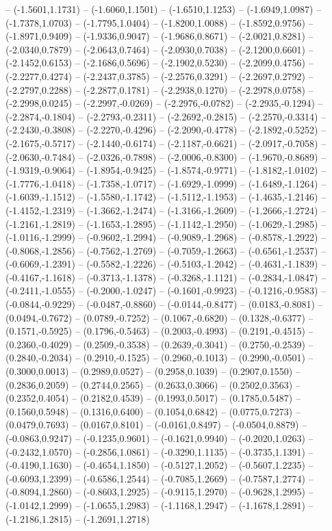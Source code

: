 {	-- (-1.5601,1.1731)
	-- (-1.6060,1.1501)
	-- (-1.6510,1.1253)
	-- (-1.6949,1.0987)
	-- (-1.7378,1.0703)
	-- (-1.7795,1.0404)
	-- (-1.8200,1.0088)
	-- (-1.8592,0.9756)
	-- (-1.8971,0.9409)
	-- (-1.9336,0.9047)
	-- (-1.9686,0.8671)
	-- (-2.0021,0.8281)
	-- (-2.0340,0.7879)
	-- (-2.0643,0.7464)
	-- (-2.0930,0.7038)
	-- (-2.1200,0.6601)
	-- (-2.1452,0.6153)
	-- (-2.1686,0.5696)
	-- (-2.1902,0.5230)
	-- (-2.2099,0.4756)
	-- (-2.2277,0.4274)
	-- (-2.2437,0.3785)
	-- (-2.2576,0.3291)
	-- (-2.2697,0.2792)
	-- (-2.2797,0.2288)
	-- (-2.2877,0.1781)
	-- (-2.2938,0.1270)
	-- (-2.2978,0.0758)
	-- (-2.2998,0.0245)
	-- (-2.2997,-0.0269)
	-- (-2.2976,-0.0782)
	-- (-2.2935,-0.1294)
	-- (-2.2874,-0.1804)
	-- (-2.2793,-0.2311)
	-- (-2.2692,-0.2815)
	-- (-2.2570,-0.3314)
	-- (-2.2430,-0.3808)
	-- (-2.2270,-0.4296)
	-- (-2.2090,-0.4778)
	-- (-2.1892,-0.5252)
	-- (-2.1675,-0.5717)
	-- (-2.1440,-0.6174)
	-- (-2.1187,-0.6621)
	-- (-2.0917,-0.7058)
	-- (-2.0630,-0.7484)
	-- (-2.0326,-0.7898)
	-- (-2.0006,-0.8300)
	-- (-1.9670,-0.8689)
	-- (-1.9319,-0.9064)
	-- (-1.8954,-0.9425)
	-- (-1.8574,-0.9771)
	-- (-1.8182,-1.0102)
	-- (-1.7776,-1.0418)
	-- (-1.7358,-1.0717)
	-- (-1.6929,-1.0999)
	-- (-1.6489,-1.1264)
	-- (-1.6039,-1.1512)
	-- (-1.5580,-1.1742)
	-- (-1.5112,-1.1953)
	-- (-1.4635,-1.2146)
	-- (-1.4152,-1.2319)
	-- (-1.3662,-1.2474)
	-- (-1.3166,-1.2609)
	-- (-1.2666,-1.2724)
	-- (-1.2161,-1.2819)
	-- (-1.1653,-1.2895)
	-- (-1.1142,-1.2950)
	-- (-1.0629,-1.2985)
	-- (-1.0116,-1.2999)
	-- (-0.9602,-1.2994)
	-- (-0.9089,-1.2968)
	-- (-0.8578,-1.2922)
	-- (-0.8068,-1.2856)
	-- (-0.7562,-1.2769)
	-- (-0.7059,-1.2663)
	-- (-0.6561,-1.2537)
	-- (-0.6069,-1.2391)
	-- (-0.5582,-1.2226)
	-- (-0.5103,-1.2042)
	-- (-0.4631,-1.1839)
	-- (-0.4167,-1.1618)
	-- (-0.3713,-1.1378)
	-- (-0.3268,-1.1121)
	-- (-0.2834,-1.0847)
	-- (-0.2411,-1.0555)
	-- (-0.2000,-1.0247)
	-- (-0.1601,-0.9923)
	-- (-0.1216,-0.9583)
	-- (-0.0844,-0.9229)
	-- (-0.0487,-0.8860)
	-- (-0.0144,-0.8477)
	-- (0.0183,-0.8081)
	-- (0.0494,-0.7672)
	-- (0.0789,-0.7252)
	-- (0.1067,-0.6820)
	-- (0.1328,-0.6377)
	-- (0.1571,-0.5925)
	-- (0.1796,-0.5463)
	-- (0.2003,-0.4993)
	-- (0.2191,-0.4515)
	-- (0.2360,-0.4029)
	-- (0.2509,-0.3538)
	-- (0.2639,-0.3041)
	-- (0.2750,-0.2539)
	-- (0.2840,-0.2034)
	-- (0.2910,-0.1525)
	-- (0.2960,-0.1013)
	-- (0.2990,-0.0501)
	-- (0.3000,0.0013)
	-- (0.2989,0.0527)
	-- (0.2958,0.1039)
	-- (0.2907,0.1550)
	-- (0.2836,0.2059)
	-- (0.2744,0.2565)
	-- (0.2633,0.3066)
	-- (0.2502,0.3563)
	-- (0.2352,0.4054)
	-- (0.2182,0.4539)
	-- (0.1993,0.5017)
	-- (0.1785,0.5487)
	-- (0.1560,0.5948)
	-- (0.1316,0.6400)
	-- (0.1054,0.6842)
	-- (0.0775,0.7273)
	-- (0.0479,0.7693)
	-- (0.0167,0.8101)
	-- (-0.0161,0.8497)
	-- (-0.0504,0.8879)
	-- (-0.0863,0.9247)
	-- (-0.1235,0.9601)
	-- (-0.1621,0.9940)
	-- (-0.2020,1.0263)
	-- (-0.2432,1.0570)
	-- (-0.2856,1.0861)
	-- (-0.3290,1.1135)
	-- (-0.3735,1.1391)
	-- (-0.4190,1.1630)
	-- (-0.4654,1.1850)
	-- (-0.5127,1.2052)
	-- (-0.5607,1.2235)
	-- (-0.6093,1.2399)
	-- (-0.6586,1.2544)
	-- (-0.7085,1.2669)
	-- (-0.7587,1.2774)
	-- (-0.8094,1.2860)
	-- (-0.8603,1.2925)
	-- (-0.9115,1.2970)
	-- (-0.9628,1.2995)
	-- (-1.0142,1.2999)
	-- (-1.0655,1.2983)
	-- (-1.1168,1.2947)
	-- (-1.1678,1.2891)
	-- (-1.2186,1.2815)
	-- (-1.2691,1.2718)
}
